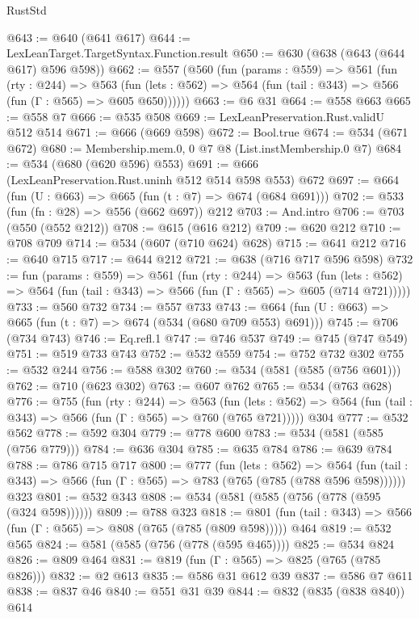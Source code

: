 \begin{lexlean}{RustStd}
\begin{coremodule}
@643 := @640 (@641 @617)
@644 := LexLeanTarget.TargetSyntax.Function.result
@650 := @630 (@638 (@643 (@644 @617) @596 @598))
@662 := @557
    (@560
      (fun (params : @559) =>
      @561
        (fun (rty : @244) =>
        @563
          (fun (lets : @562) => @564 (fun (tail : @343) => @566 (fun (Γ : @565) => @605 @650))))))
@663 := @6 @31
@664 := @558 @663
@665 := @558 @7
@666 := @535 @508
@669 := LexLeanPreservation.Rust.validU @512 @514
@671 := @666 (@669 @598)
@672 := Bool.true
@674 := @534 (@671 @672)
@680 := Membership.mem.{0, 0} @7 @8 (List.instMembership.{0} @7)
@684 := @534 (@680 (@620 @596) @553)
@691 := @666 (LexLeanPreservation.Rust.uninh @512 @514 @598 @553) @672
@697 := @664 (fun (U : @663) => @665 (fun (t : @7) => @674 (@684 @691)))
@702 := @533 (fun (fn : @28) => @556 (@662 @697)) @212
@703 := And.intro
@706 := @703 (@550 (@552 @212))
@708 := @615 (@616 @212)
@709 := @620 @212
@710 := @708 @709
@714 := @534 (@607 (@710 @624) @628)
@715 := @641 @212
@716 := @640 @715
@717 := @644 @212
@721 := @638 (@716 @717 @596 @598)
@732 := fun (params : @559) =>
  @561
    (fun (rty : @244) =>
    @563
      (fun (lets : @562) => @564 (fun (tail : @343) => @566 (fun (Γ : @565) => @605 (@714 @721)))))
@733 := @560 @732
@734 := @557 @733
@743 := @664 (fun (U : @663) => @665 (fun (t : @7) => @674 (@534 (@680 @709 @553) @691)))
@745 := @706 (@734 @743)
@746 := Eq.refl.{1}
@747 := @746 @537
@749 := @745 (@747 @549)
@751 := @519 @733 @743
@752 := @532 @559
@754 := @752 @732 @302
@755 := @532 @244
@756 := @588 @302
@760 := @534 (@581 (@585 (@756 @601)))
@762 := @710 (@623 @302)
@763 := @607 @762
@765 := @534 (@763 @628)
@776 := @755
    (fun (rty : @244) =>
    @563
      (fun (lets : @562) => @564 (fun (tail : @343) => @566 (fun (Γ : @565) => @760 (@765 @721)))))
    @304
@777 := @532 @562
@778 := @592 @304
@779 := @778 @600
@783 := @534 (@581 (@585 (@756 @779)))
@784 := @636 @304
@785 := @635 @784
@786 := @639 @784
@788 := @786 @715 @717
@800 := @777
    (fun (lets : @562) =>
    @564 (fun (tail : @343) => @566 (fun (Γ : @565) => @783 (@765 (@785 (@788 @596 @598))))))
    @323
@801 := @532 @343
@808 := @534 (@581 (@585 (@756 (@778 (@595 (@324 @598))))))
@809 := @788 @323
@818 := @801 (fun (tail : @343) => @566 (fun (Γ : @565) => @808 (@765 (@785 (@809 @598))))) @464
@819 := @532 @565
@824 := @581 (@585 (@756 (@778 (@595 @465))))
@825 := @534 @824
@826 := @809 @464
@831 := @819 (fun (Γ : @565) => @825 (@765 (@785 @826)))
@832 := @2 @613
@835 := @586 @31 @612 @39
@837 := @586 @7 @611
@838 := @837 @46
@840 := @551 @31 @39
@844 := @832 (@835 (@838 @840)) @614

\end{coremodule}
\end{lexlean}
